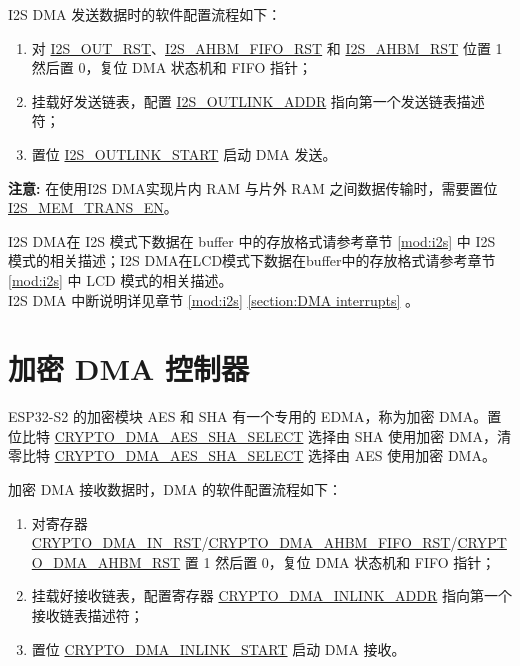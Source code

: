 \documentclass[main\_\_CN.tex]{subfiles}
\begin{document}
I2S DMA 发送数据时的软件配置流程如下：
\begin{enumerate}
   \item 对 \hyperref[fielddesc:I2SOUTRST]{I2S\_OUT\_RST}、\hyperref[fielddesc:I2SAHBMFIFORST]{I2S\_AHBM\_FIFO\_RST} 和 \hyperref[fielddesc:I2SAHBMRST]{I2S\_AHBM\_RST} 位置 1 然后置 0，复位 DMA 状态机和 FIFO 指针；
   \item 挂载好发送链表，配置 \hyperref[fielddesc:I2SOUTLINKADDR]{I2S\_OUTLINK\_ADDR} 指向第一个发送链表描述符；
   \item 置位 \hyperref[fielddesc:I2SOUTLINKSTART]{I2S\_OUTLINK\_START} 启动 DMA 发送。
\end{enumerate}

 {\bfseries 注意: }在使用I2S DMA实现片内 RAM 与片外 RAM 之间数据传输时，需要置位\hyperref[fielddesc:I2SMEMTRANSEN]{I2S\_MEM\_TRANS\_EN}。

I2S DMA在 I2S 模式下数据在 buffer 中的存放格式请参考章节 \ref{mod:i2s} \textit{} 中 I2S 模式的相关描述；I2S DMA在LCD模式下数据在buffer中的存放格式请参考章节 \ref{mod:i2s} \textit{} 中 LCD 模式的相关描述。\\
I2S DMA 中断说明详见章节 \ref{mod:i2s} \textit{} \ref{section:DMA interrupts} \textit{}。

\section{加密 DMA 控制器}\label{subsection:dma-crypto}
ESP32-S2 的加密模块 AES 和 SHA 有一个专用的 EDMA，称为加密 DMA。置位比特 \hyperref[fielddesc:CRYPTODMAAESSHASELECT]{CRYPTO\_DMA\_AES\_SHA\_SELECT} 选择由 SHA 使用加密 DMA，清零比特 \hyperref[fielddesc:CRYPTODMAAESSHASELECT]{CRYPTO\_DMA\_AES\_SHA\_SELECT} 选择由 AES 使用加密 DMA。

加密 DMA 接收数据时，DMA 的软件配置流程如下：
\begin{enumerate}
    \item 对寄存器 \hyperref[fielddesc:CRYPTODMAINRST]{CRYPTO\_DMA\_IN\_RST}/\hyperref[fielddesc:CRYPTODMAAHBMFIFORST]{CRYPTO\_DMA\_AHBM\_FIFO\_RST}/\hyperref[fielddesc:CRYPTODMAAHBMRST]{CRYPTO\_DMA\_AHBM\_RST} 置 1 然后置 0，复位 DMA 状态机和 FIFO 指针；
    \item 挂载好接收链表，配置寄存器 \hyperref[fielddesc:CRYPTODMAINLINKADDR]{CRYPTO\_DMA\_INLINK\_ADDR} 指向第一个接收链表描述符；
    \item 置位 \hyperref[fielddesc:CRYPTODMAINLINKSTART]{CRYPTO\_DMA\_INLINK\_START} 启动 DMA 接收。
\end{enumerate}
\end{document}
